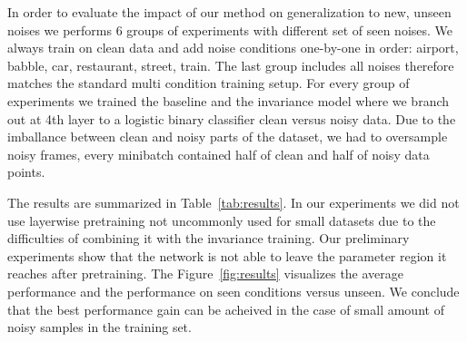 \documentclass{article}
\begin{document}
In order to evaluate the impact of our method on generalization to new, unseen noises 
we performs 6 groups of experiments with different set of seen noises. We always train
on clean data and add noise conditions one-by-one in order: airport, babble, car, 
restaurant, street, train. The last group includes all noises therefore matches the
standard multi condition training setup. For every group of experiments we trained the
baseline and the invariance model where we branch out at 4th layer to a logistic 
binary classifier clean versus noisy data. Due to the imballance between clean and
noisy parts of the dataset, we had to oversample noisy frames, every minibatch contained
half of clean and half of noisy data points.

The results are summarized in Table~\ref{tab:results}. 
In our experiments we did not use layerwise pretraining not uncommonly used for small
datasets due to the difficulties of combining it with the invariance training. Our preliminary
experiments show that the network is not able to leave the parameter region it reaches after 
pretraining. The Figure~\ref{fig:results} visualizes the average performance and the
performance on seen conditions versus unseen. We conclude that the best performance
gain can be acheived in the case of small amount of noisy samples in the training set.
\end{document}
